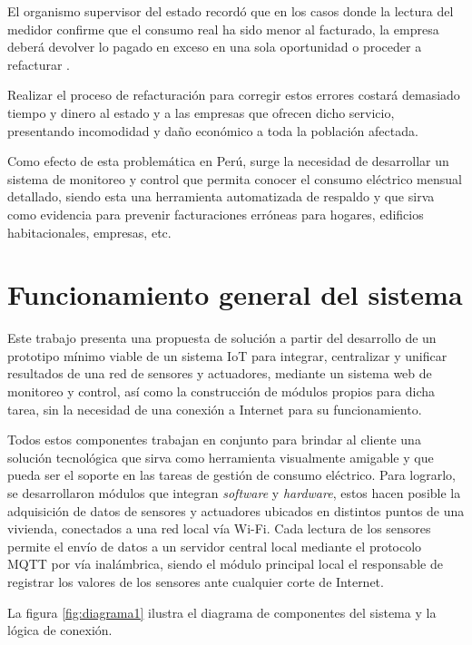 El organismo supervisor del estado recordó que en los casos donde la lectura del medidor confirme que el consumo real ha sido menor al facturado, la empresa deberá devolver lo pagado en exceso en una sola oportunidad o proceder a refacturar \citep{WEBSITE:2}.

Realizar el proceso de refacturación para corregir estos errores costará demasiado tiempo y dinero al estado y a las empresas que ofrecen dicho servicio, presentando incomodidad y daño económico a toda la población afectada. 

Como efecto de esta problemática en Perú, surge la necesidad de desarrollar un sistema de monitoreo y control que permita conocer el consumo eléctrico mensual detallado, siendo esta una herramienta automatizada de respaldo y que sirva como evidencia para prevenir facturaciones erróneas para hogares, edificios habitacionales, empresas, etc.




\section{Funcionamiento general del sistema}

Este trabajo presenta una propuesta de solución a partir del desarrollo de un prototipo mínimo viable de un sistema IoT para integrar, centralizar y unificar resultados de una red de sensores y actuadores, mediante un sistema web de monitoreo y control, así como la construcción de módulos propios para dicha tarea, sin la necesidad de una conexión a Internet para su funcionamiento. 

Todos estos componentes trabajan en conjunto para brindar al cliente una solución tecnológica que sirva como herramienta visualmente amigable y que pueda ser el soporte en las tareas de gestión de consumo eléctrico. Para lograrlo, se desarrollaron módulos que integran \emph{software} y \emph{hardware}, estos hacen posible la adquisición de datos de sensores y actuadores ubicados en distintos puntos de una vivienda, conectados a una red local vía Wi-Fi. Cada lectura de los sensores permite el envío de datos a un servidor central local mediante el protocolo MQTT por vía inalámbrica, siendo el módulo principal local el responsable de registrar los valores de los sensores ante cualquier corte de Internet. 

La figura \ref{fig:diagrama1} ilustra el diagrama de componentes del sistema y la lógica de conexión.

